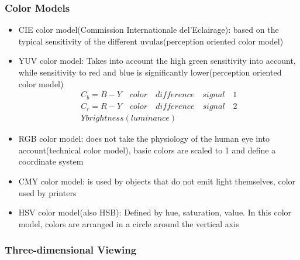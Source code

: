 \documentclass{standalone}
\begin{document}
\subsubsection*{Color Models}
\begin{itemize}
		\item CIE color model(Commission Internationale del'Eclairage): based on the typical sensitivity of the different uvulas(perception oriented color model)
		\item YUV color model: Takes into account the high green sensitivity into account, while sensitivity to red and blue is significantly lower(perception oriented color model)
		\begin{equation}
		\begin{split}
		C_b = B - Y \quad color \quad  difference \quad signal \quad 1 \\
		C_r = R - Y \quad color \quad difference \quad signal \quad 2 \\
		Y brightness (luminance)
		\end{split}
		\end{equation}
		\item RGB color model: does not take the physiology of the human eye into account(technical color model), basic colors are scaled to 1 and define a coordinate system
		\item CMY color model: is used by objects that do not emit light themselves, color used by printers
		\item HSV color model(also HSB): Defined by hue, saturation, value. In this color model, colors are arranged in a circle around the vertical axis
\end{itemize}
\subsubsection{Three-dimensional Viewing}
\end{document}
